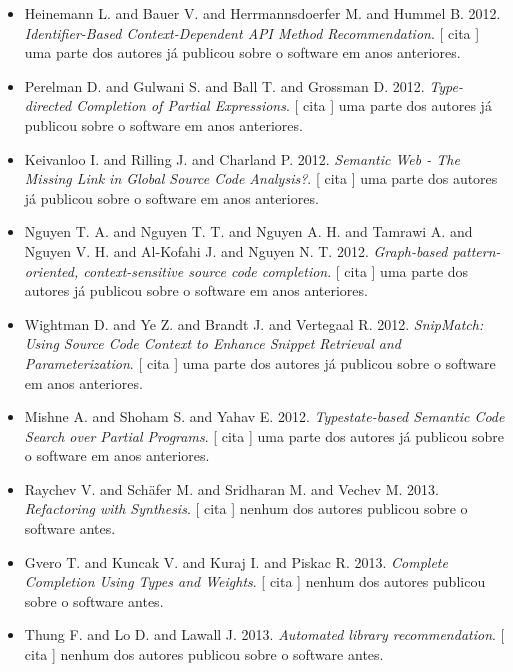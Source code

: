\begin{itemize}
      [
          cita
      ]
nenhum dos autores publicou sobre o software antes.
\item Heinemann L. and Bauer V. and Herrmannsdoerfer M. and Hummel B.
      2012.
        \textit{ Identifier-Based Context-Dependent API Method Recommendation}.
      [
          cita
      ]
uma parte dos autores já publicou sobre o software em anos anteriores.
\item Perelman D. and Gulwani S. and Ball T. and Grossman D.
      2012.
        \textit{ Type-directed Completion of Partial Expressions}.
      [
          cita
      ]
uma parte dos autores já publicou sobre o software em anos anteriores.
\item Keivanloo I. and Rilling J. and Charland P.
      2012.
        \textit{ Semantic Web - The Missing Link in Global Source Code Analysis?}.
      [
          cita
      ]
uma parte dos autores já publicou sobre o software em anos anteriores.
\item Nguyen T. A. and Nguyen T. T. and Nguyen A. H. and Tamrawi A. and Nguyen V. H. and Al-Kofahi J. and Nguyen N. T.
      2012.
        \textit{ Graph-based pattern-oriented, context-sensitive source code completion}.
      [
          cita
      ]
uma parte dos autores já publicou sobre o software em anos anteriores.
\item Wightman D. and Ye Z. and Brandt J. and Vertegaal R.
      2012.
        \textit{ SnipMatch: Using Source Code Context to Enhance Snippet Retrieval and Parameterization}.
      [
          cita
      ]
uma parte dos autores já publicou sobre o software em anos anteriores.
\item Mishne A. and Shoham S. and Yahav E.
      2012.
        \textit{ Typestate-based Semantic Code Search over Partial Programs}.
      [
          cita
      ]
uma parte dos autores já publicou sobre o software em anos anteriores.
\item Raychev V. and Sch\"{a}fer M. and Sridharan M. and Vechev M.
      2013.
        \textit{ Refactoring with Synthesis}.
      [
          cita
      ]
nenhum dos autores publicou sobre o software antes.
\item Gvero T. and Kuncak V. and Kuraj I. and Piskac R.
      2013.
        \textit{ Complete Completion Using Types and Weights}.
      [
          cita
      ]
nenhum dos autores publicou sobre o software antes.
\item Thung F. and Lo D. and Lawall J.
      2013.
        \textit{ Automated library recommendation}.
      [
          cita
      ]
nenhum dos autores publicou sobre o software antes.

\end{itemize}
